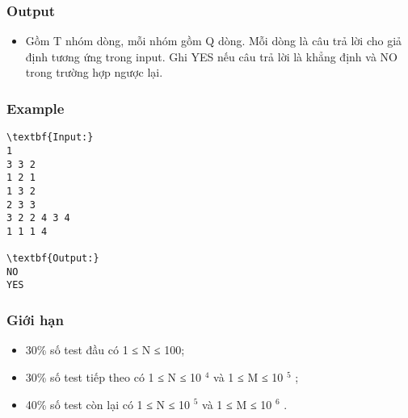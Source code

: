 \subsubsection{Output}
\begin{itemize}
	\item Gồm T nhóm dòng, mỗi nhóm gồm Q dòng. Mỗi dòng là câu trả lời cho giả định tương ứng trong input. Ghi YES nếu câu trả lời là khẳng định và NO trong trường hợp ngược lại.
\end{itemize}

\subsubsection{Example}
\begin{verbatim}
\textbf{Input:}
1
3 3 2
1 2 1
1 3 2
2 3 3
3 2 2 4 3 4
1 1 1 4

\textbf{Output:}
NO
YES\end{verbatim}

\subsubsection{Giới hạn}
\begin{itemize}
	\item 30\% số test đầu có 1 ≤ N ≤ 100;
	\item 30\% số test tiếp theo có 1 ≤ N ≤ 10 $^ 4 $ và 1 ≤ M ≤ 10 $^ 5 $ ;
	\item 40\% số test còn lại có 1 ≤ N ≤ 10 $^ 5 $ và 1 ≤ M ≤ 10 $^ 6 $ .
\end{itemize}
